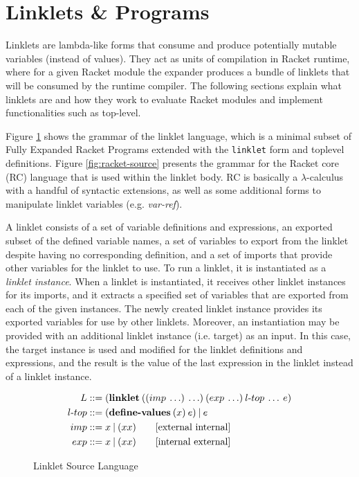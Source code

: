 \documentclass[sigplan,screen,anonymous]{acmart}
\def\dash {\text{-}}
\begin{document}
\section{Linklets \& Programs}

Linklets are lambda-like forms that consume and produce potentially
mutable variables (instead of values). They act as units of
compilation in Racket runtime, where for a given Racket module the
expander produces a bundle of linklets that will be consumed by the
runtime compiler. The following sections explain what linklets are and
how they work to evaluate Racket modules and implement functionalities
such as top-level.

Figure \ref{fig:linklet-source} shows the grammar of the linklet
language, which is a minimal subset of Fully Expanded Racket Programs
extended with the \verb|linklet| form and toplevel definitions. Figure
\ref{fig:racket-source} presents the grammar for the Racket core (RC)
language that is used within the linklet body. RC is basically a
$\lambda$-calculus with a handful of syntactic extensions, as well as some
additional forms to manipulate linklet variables
(e.g. \textit{var-ref}).

A linklet consists of a set of variable definitions and expressions,
an exported subset of the defined variable names, a set of variables
to export from the linklet despite having no corresponding definition,
and a set of imports that provide other variables for the linklet to
use. To run a linklet, it is instantiated as a {\it linklet
  instance}. When a linklet is instantiated, it receives other linklet
instances for its imports, and it extracts a specified set of
variables that are exported from each of the given instances. The
newly created linklet instance provides its exported variables for use
by other linklets. Moreover, an instantiation may be provided with an
additional linklet instance (i.e. target) as an input. In this case,
the target instance is used and modified for the linklet definitions
and expressions, and the result is the value of the last expression in
the linklet instead of a linklet instance.

\begin{figure}[tbp]
  \begin{align*}
    L  &::= (\textbf{linklet}\:((imp\: \ldots)\: \ldots)\:(exp\: \ldots)\:l\dash top\:\ldots\:e)\\
    l\dash top &::= (\textbf{define\dash values}\:(x)\:e)\:|\:e \\
    imp &::= x\:|\:(x x) \tag*{[external internal]}\\
    exp &::= x\:|\:(x x) \tag*{[internal external]}
  \end{align*}
  \caption{Linklet Source Language}
  \label{fig:linklet-source}
\end{figure}
\end{document}
